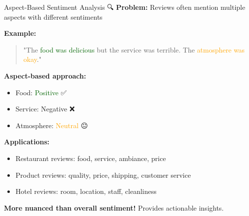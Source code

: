 \documentclass[aspectratio=169]{beamer}
\begin{document}
\begin{frame}[shrink=10]{Aspect-Based Sentiment Analysis 🔍}
    \textbf{Problem:} Reviews often mention multiple aspects with different sentiments

    \vspace{0.5em}
    \textbf{Example:}
    \begin{quote}
        "The \textcolor{darkgreen}{food was delicious} but the \textcolor{lightred}{service was terrible}. The \textcolor{orange}{atmosphere was okay}."
    \end{quote}

    \vspace{0.5em}
    \textbf{Aspect-based approach:}
    \begin{itemize}\setlength{\itemsep}{0pt}
        \item Food: \textcolor{darkgreen}{Positive} ✅
        \item Service: \textcolor{lightred}{Negative} ❌
        \item Atmosphere: \textcolor{orange}{Neutral} 😐
    \end{itemize}

    \vspace{0.5em}
    \textbf{Applications:}
    \begin{itemize}\setlength{\itemsep}{0pt}
        \item Restaurant reviews: food, service, ambiance, price
        \item Product reviews: quality, price, shipping, customer service
        \item Hotel reviews: room, location, staff, cleanliness
    \end{itemize}

    \vspace{0.5em}
    \textbf{More nuanced than overall sentiment!} Provides actionable insights.
\end{frame}
\end{document}
